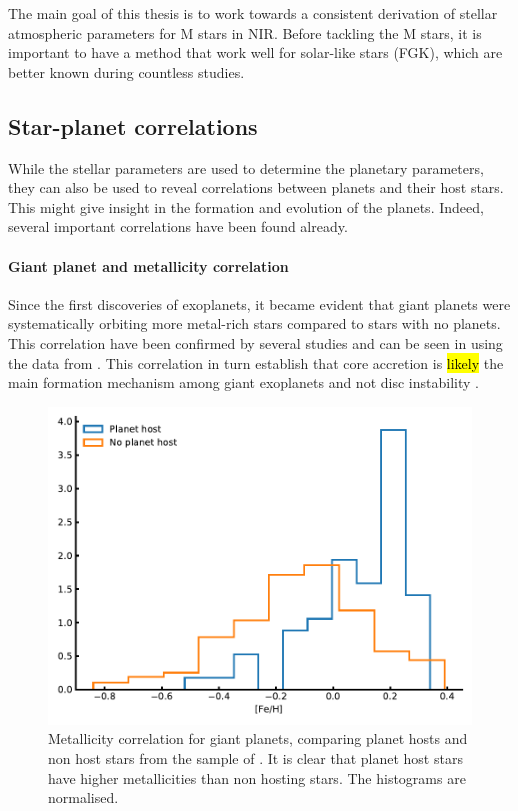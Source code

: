 The main goal of this thesis is to work towards a consistent derivation of stellar atmospheric
parameters for M stars in NIR. Before tackling the M stars, it is important to have a method that
work well for solar-like stars (FGK), which are better known during countless studies.

\subsection{Star-planet correlations}
\label{sec:starPlanetCorrelation}

While the stellar parameters are used to determine the planetary parameters, they can also be used
to reveal correlations between planets and their host stars. This might give insight in the
formation and evolution of the planets. Indeed, several important correlations have been found
already.

\paragraph{Giant planet and metallicity correlation}

Since the first discoveries of exoplanets, it became evident that giant planets were systematically
orbiting more metal-rich stars compared to stars with no planets. This correlation have been
confirmed by several studies \citep{Gonzalez1997,Santos2004,Fischer2005,Sousa2008a,Mortier2013b} and
can be seen in  using the data from \citet{Sousa2008a}. This correlation in
turn establish that core accretion is \hl{likely} the main formation mechanism among giant exoplanets
\citep{Pollack1996,Ida2004,Mordasini2012} and not disc instability \citep{Boss2002}.

\begin{figure}[htpb!]
    \centering
    \includegraphics[width=1.0\linewidth]{figures/fehCorrelation.pdf}
    \caption{Metallicity correlation for giant planets, comparing planet hosts and non host stars
             from the sample of \citet{Sousa2008a}. It is clear that planet host stars have higher
             metallicities than non hosting stars. The histograms are normalised.}
    \label{fig:fehCorrelation}
\end{figure}


